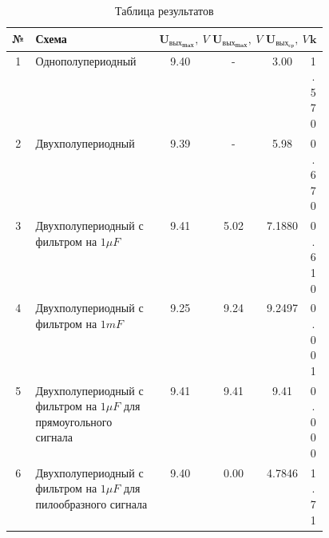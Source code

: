 \begin{table}[htbp]
    \centering
    \begin{tabular}{|c|p{0.46\linewidth}|c|c|c|c|}
        \hline
        \textbf{№} & \textbf{Схема} & $\mathbf{U_{\text{вых}_{max}}},\ V$ & $\mathbf{U_{\text{вых}_{max}}},\ V$ & $\mathbf{U_{\text{вых}_{\text{ср}}}},\ V$ & $\mathbf{k}$\\
        \hline
        1 & Однополупериодный & 9.40 & - & 3.00 & 1.570\\
        \hline
        2 & Двухполупериодный & 9.39 & - & 5.98 & 0.670\\
        \hline
        3 & Двухполупериодный с фильтром на $1\mu F$ & 9.41 & 5.02 & 7.1880 & 0.610\\
        \hline
        4 & Двухполупериодный с фильтром на $1mF$ & 9.25 & 9.24 & 9.2497 & 0.001\\
        \hline
        5 & Двухполупериодный с фильтром на $1\mu F$ для прямоугольного сигнала & 9.41 & 9.41 & 9.41 & 0.000\\
        \hline
        6 & Двухполупериодный с фильтром на $1\mu F$ для пилообразного сигнала & 9.40 & 0.00 & 4.7846 & 1.71\\
        \hline
    \end{tabular}
    \caption{Таблица результатов}
    \label{tab:results}
\end{table}


